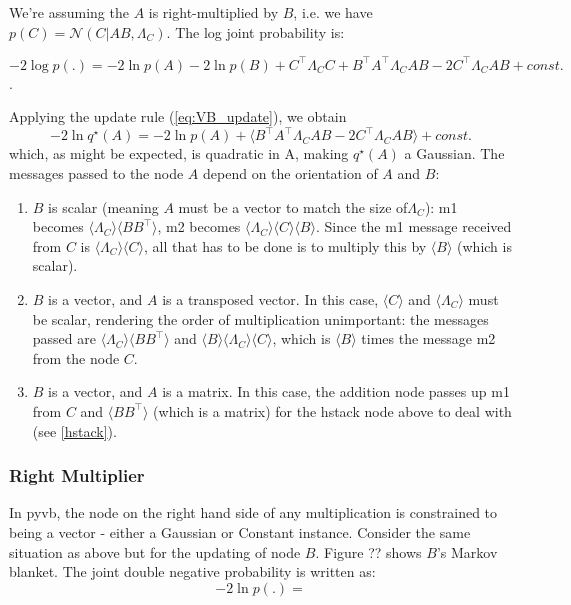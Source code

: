 \documentclass{article}
\newcommand{\const}{\textit{const.}}
\newcommand{\qs}{q^\star}
\newcommand{\<}{\langle}
\renewcommand{\>}{\rangle}
\begin{document}
We're assuming the $A$ is right-multiplied by $B$, i.e. we have $p(C) = \mathcal{N}(C | AB, \Lambda_C)$.  The log joint probability is:
	
\begin{equation}
-2 \log p(.) = -2\ln p(A) -2\ln p(B) + C^\top\Lambda_CC + B^\top A^\top \Lambda_C AB -2 C^\top \Lambda_C AB + \const
\end{equation}.  

Applying the update rule (\ref{eq:VB_update}), we obtain
\begin{equation}
-2\ln \qs(A) = -2 \ln p(A) + \< B^\top A^\top \Lambda_C AB -2 C^\top \Lambda_C AB \> + \const
\end{equation}
which, as might be expected, is quadratic in A, making $\qs(A)$ a Gaussian. The messages passed to the node $A$ depend on the orientation of $A$ and $B$:
\begin{enumerate}
\item $B$ is scalar (meaning $A$ must be a vector to match the size of$\Lambda_C$): m1 becomes $\<\Lambda_C\>\<BB^\top\>$, m2 becomes $\<\Lambda_C\>\<C\>\<B\>$. Since the m1 message received from $C$ is $\<\Lambda_C\>\<C\>$, all that has to be done is to multiply this by $\<B\>$ (which is scalar).
\item $B$ is a vector, and $A$ is a transposed vector. In this case, $\<C\>$ and $\<\Lambda_C\>$ must be scalar, rendering the order of multiplication unimportant: the messages passed are $\<\Lambda_C\>\<BB^\top\>$ and $\<B\>\<\Lambda_C\>\<C\>$, which is $\<B\>$ times the message m2 from the node $C$.  
\item $B$ is a vector, and $A$ is a matrix.  In this case, the addition node passes up m1 from $C$ and $\<BB^\top\>$ (which is a matrix) for the hstack node above to deal with (see \ref{hstack}).  
\end{enumerate}


\subsubsection{Right Multiplier}
In pyvb, the node on the right hand side of any multiplication is constrained to being a vector - either a Gaussian or Constant instance.  
Consider the same situation as above but for the updating of node $B$.  Figure {??} shows $B$'s Markov blanket. The joint double negative probability is written as:
\begin{equation}
-2\ln p(.) = 
\end{equation}
\end{document}
